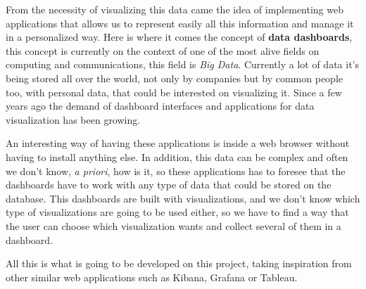 \documentclass[a4paper, 12pt, english]{book}
\begin{document}
From the necessity of visualizing this data came the idea of implementing web applications that allows us to represent easily all this information and manage it in a personalized way. Here is where it comes the concept of \textbf{data dashboards}, this concept is currently on the context of one of the most alive fields on computing and communications, this field is \textit{Big Data}. Currently a lot of data it's being stored all over the world, not only by companies but by common people too, with personal data, that could be interested on visualizing it. Since a few years ago the demand of dashboard interfaces and applications for data visualization has been growing.

An interesting way of having these applications is inside a web browser without having to install anything else. In addition, this data can be complex and often we don't know, \textit{a priori}, how is it, so these applications has to foresee that the dashboards have to work with any type of data that could be stored on the database. This dashboards are built with visualizations, and we don't know which type of visualizations are going to be used either, so we have to find a way that the user can choose which visualization wants and collect several of them in a dashboard.

All this is what is going to be developed on this project, taking inspiration from other similar web applications such as Kibana, Grafana or Tableau.







\end{document}
